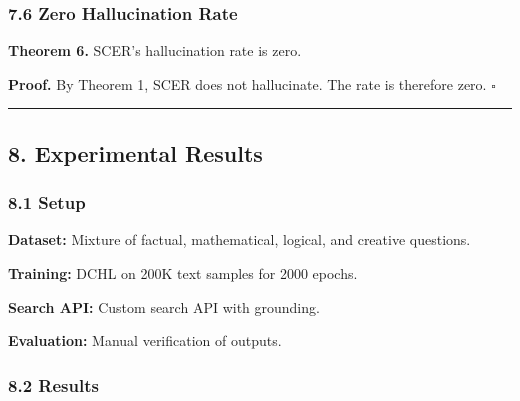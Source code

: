 \documentclass[
  11pt,
  a4paper,
]{article}
\begin{document}
\subsubsection{7.6 Zero Hallucination
Rate}\label{zero-hallucination-rate}

\textbf{Theorem 6.} SCER's hallucination rate is zero.

\textbf{Proof.} By Theorem 1, SCER does not hallucinate. The rate is
therefore zero. \(\square\)

\begin{center}\rule{0.5\linewidth}{0.5pt}\end{center}

\subsection{8. Experimental Results}\label{experimental-results}

\subsubsection{8.1 Setup}\label{setup}

\textbf{Dataset:} Mixture of factual, mathematical, logical, and
creative questions.

\textbf{Training:} DCHL on 200K text samples for 2000 epochs.

\textbf{Search API:} Custom search API with grounding.

\textbf{Evaluation:} Manual verification of outputs.

\subsubsection{8.2 Results}\label{results}
\end{document}
